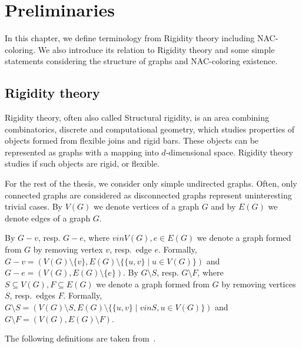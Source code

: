 
\chapter{Preliminaries}%
\label{chapter:preliminaries}

\begin{chapterabstract}

	In this chapter, we define terminology from Rigidity theory including NAC-coloring.
	We also introduce its relation to Rigidity theory and
	some simple statements considering
	the structure of graphs and NAC-coloring existence.

\end{chapterabstract}

\section{Rigidity theory}

Rigidity theory, often also called Structural rigidity,
is an area combining combinatorics, discrete and computational geometry,
which studies properties of objects formed from flexible joins and rigid bars.
These objects can be represented as graphs with
a mapping into \( d \)-dimensional space.
Rigidity theory studies if such objects are rigid, or flexible.

For the rest of the thesis,
we consider only simple undirected graphs.
Often, only connected graphs are considered as disconnected graphs
represent uninteresting trivial cases.
By \( V(G) \) we denote vertices of a graph \( G \) and
by \( E(G) \) we denote edges of a graph \( G \).

By \( G - v \), resp. \( G - e \),
where \( v in V(G), e \in E(G) \) we denote a graph
formed from \( G \) by removing vertex \( v \), resp.\ edge \( e \).
Formally,
\( G - v = (V(G) \setminus \{v\}, E(G) \setminus \{\{u, v\} \mid u \in V(G)\}) \)
and \( G - e = (V(G), E(G) \setminus \{e\}) \).
By \( G \setminus S \), resp. \( G \setminus F \),
where \( S \subseteq V(G), F \subseteq E(G) \) we denote a graph
formed from \( G \) by removing vertices \( S \), resp.\ edges \( F \).
Formally,
\( G \setminus S = (V(G) \setminus S, E(G) \setminus \{\{u, v\} \mid v in S, u \in V(G)\}) \)
and \( G \setminus F = (V(G), E(G) \setminus F) \).

The following definitions are taken from~\cite{np_complete,my_paper}.

